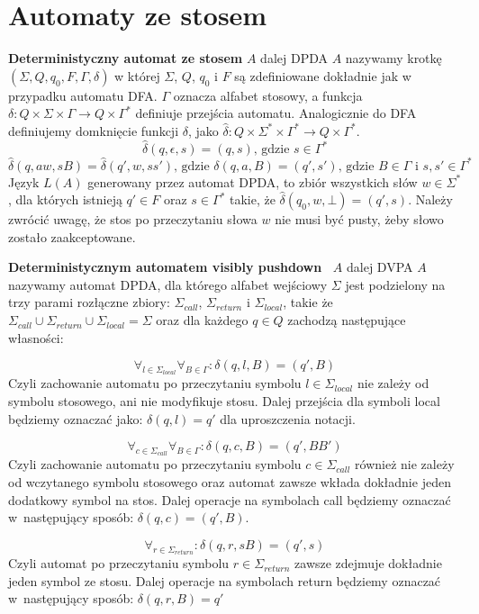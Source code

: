 \section{Automaty ze stosem}

\textbf{Deterministyczny automat ze stosem} $A$ dalej DPDA $A$ nazywamy krotkę $(\Sigma, Q, q_0, F, \Gamma, \delta)$
w której $\Sigma$, $Q$, $q_0$ i $F$ są zdefiniowane dokładnie jak w przypadku automatu DFA. $\Gamma$ oznacza alfabet stosowy,
a funkcja $\delta : Q\times\Sigma\times\Gamma\to Q\times\Gamma^*$ definiuje przejścia automatu.
Analogicznie do DFA definiujemy domknięcie funkcji $\delta$, jako $\widehat{\delta}: Q\times\Sigma^*\times\Gamma^* \to Q\times\Gamma^*$.
$$\widehat{\delta}(q, \epsilon, s) = (q, s) \text{,\ gdzie\ } s \in \Gamma^*$$
$$\widehat{\delta}(q, aw, sB) = \widehat{\delta}(q', w, ss') \text{,\ gdzie\ } \delta(q, a, B) = (q', s') \text{,\ gdzie\ } B\in \Gamma \text{\ i\ } s, s' \in \Gamma^*$$
Język $L(A)$ generowany przez automat DPDA, to zbiór wszystkich słów $w \in \Sigma^*$, dla których istnieją $q'\in F$ oraz $s \in \Gamma^*$ takie, że $\widehat{\delta}(q_0, w, \bot) = (q', s)$.
Należy zwrócić uwagę, że stos po przeczytaniu słowa $w$ nie musi być pusty, żeby słowo zostało zaakceptowane.


\textbf{Deterministycznym automatem visibly pushdown~\cite{vpl}} $A$ dalej DVPA $A$ nazywamy automat DPDA,
dla którego alfabet wejściowy $\Sigma$ jest podzielony na trzy parami rozłączne zbiory:
$\Sigma_{call}$, $\Sigma_{return}$ i $\Sigma_{local}$,
takie że $\Sigma_{call} \cup \Sigma_{return} \cup \Sigma_{local} = \Sigma$
oraz dla każdego $q \in Q$ zachodzą następujące własności:

$$\forall_{l\in\Sigma_{local}} \forall_{B\in\Gamma} : \delta(q, l, B) = (q', B)$$
Czyli zachowanie automatu po przeczytaniu symbolu $l \in \Sigma_{local}$ nie zależy od symbolu stosowego, ani nie modyfikuje stosu.
Dalej przejścia dla symboli local będziemy oznaczać jako: $\delta(q, l) = q'$ dla uproszczenia notacji.

$$\forall_{c\in\Sigma_{call}} \forall_{B\in\Gamma} : \delta(q, c, B) = (q', BB')$$
Czyli zachowanie automatu po przeczytaniu symbolu $c \in \Sigma_{call}$ również nie zależy od wczytanego symbolu stosowego oraz automat zawsze
wkłada dokładnie jeden dodatkowy symbol na stos. Dalej operacje na symbolach call będziemy oznaczać w~następujący sposób: $\delta(q, c) = (q', B)$.

$$\forall_{r\in\Sigma_{return}} : \delta(q, r, sB) = (q', s)$$
Czyli automat po przeczytaniu symbolu $r \in \Sigma_{return}$ zawsze zdejmuje dokładnie jeden symbol ze stosu. Dalej operacje na symbolach
return będziemy oznaczać w~następujący sposób: $\delta(q, r, B) = q'$

